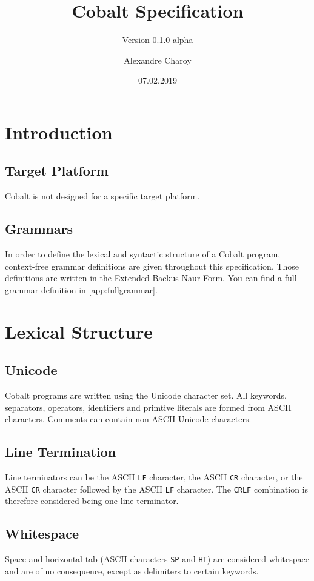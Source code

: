 \documentclass[a4paper,appendixprefix]{scrreprt}
\title{Cobalt Specification}
\subtitle{Version 0.1.0-alpha}
\author{Alexandre Charoy}
\date{07.02.2019}
\begin{document}
\maketitle

\chapter{Introduction}

\section{Target Platform}
Cobalt is not designed for a specific target platform.

\section{Grammars}
In order to define the lexical and syntactic structure of a Cobalt program, context-free grammar definitions are given throughout this specification. Those definitions are written in the \href{https://en.wikipedia.org/wiki/Extended_Backus-Naur_form}{Extended Backus-Naur Form}. You can find a full grammar definition in \ref{app:fullgrammar}.

\chapter{Lexical Structure}

\section{Unicode}
Cobalt programs are written using the Unicode character set. All keywords, separators, operators, identifiers and primtive literals are formed from ASCII characters. Comments can contain non-ASCII Unicode characters.

\section{Line Termination}
Line terminators can be the ASCII \verb!LF! character, the ASCII \verb!CR! character, or the ASCII \verb!CR! character followed by the ASCII \verb!LF! character. The \verb!CRLF! combination is therefore considered being one line terminator.

\section{Whitespace}
Space and horizontal tab (ASCII characters \verb!SP! and \verb!HT!) are considered whitespace and are of no consequence, except as delimiters to certain keywords.
\end{document}
